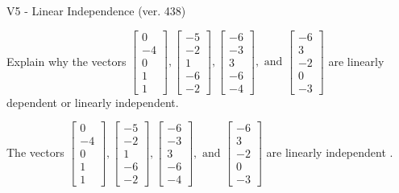 \begin{exercise}
  \begin{exerciseTitle}V5 - Linear Independence (ver. 438)\end{exerciseTitle}
  \begin{exerciseStatement}
    Explain why the vectors \(\left[\begin{array}{r}
0 \\
-4 \\
0 \\
1 \\
1
\end{array}\right] , \left[\begin{array}{r}
-5 \\
-2 \\
1 \\
-6 \\
-2
\end{array}\right] , \left[\begin{array}{r}
-6 \\
-3 \\
3 \\
-6 \\
-4
\end{array}\right] , \text{ and } \left[\begin{array}{r}
-6 \\
3 \\
-2 \\
0 \\
-3
\end{array}\right]\) are linearly dependent or linearly independent.	


  \end{exerciseStatement}
  \begin{exerciseAnswer}
   The vectors \(\left[\begin{array}{r}
0 \\
-4 \\
0 \\
1 \\
1
\end{array}\right] , \left[\begin{array}{r}
-5 \\
-2 \\
1 \\
-6 \\
-2
\end{array}\right] , \left[\begin{array}{r}
-6 \\
-3 \\
3 \\
-6 \\
-4
\end{array}\right] , \text{ and } \left[\begin{array}{r}
-6 \\
3 \\
-2 \\
0 \\
-3
\end{array}\right]\) are 
  	 linearly independent  .
  


  \end{exerciseAnswer}
\end{exercise}